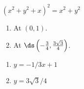 {$(x^2+y^2+x)^2 = x^2+y^2$
\begin{enumerate}
\item	At $(0,1)$.
\item	At $\ds \left(-\frac34, \frac{3 \sqrt{3}}{4}\right)$.
\end{enumerate}
}
{\begin{enumerate}
\item	$y=-1/3x+1$
\item	$y = 3\sqrt{3}/4$
\end{enumerate}
}
